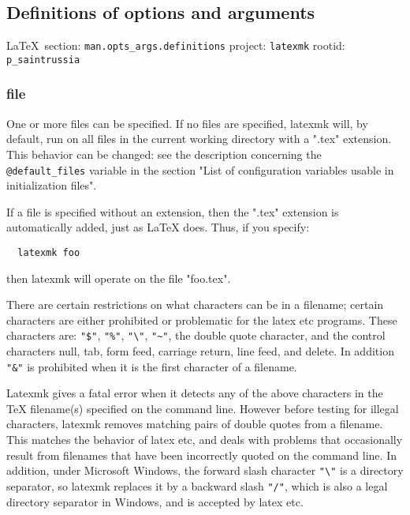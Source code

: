 

\subsection{Definitions of options and arguments}

\vspace{0.5cm}
 {\ifDEBUG\small\LaTeX~section: \verb|man.opts_args.definitions| project: \verb|latexmk| rootid: \verb|p_saintrussia| \fi}
\vspace{0.5cm}

\subsubsection{file}

One or more files can be specified.  If no files are  specified, latexmk  will,
by default, run on all files in the current working directory with a ".tex"
extension.   This  behavior  can  be changed: see the description concerning
the \verb|@default_files| variable in the section "List of configuration
variables  usable  in initialization files".

If a file is specified without an extension, then the ".tex" extension is
automatically added, just as LaTeX  does.   Thus,  if you specify:

\begin{verbatim}
  latexmk foo
\end{verbatim}

then latexmk will operate on the file "foo.tex".

There  are  certain  restrictions on what characters can be in a filename;
certain characters are either prohibited  or  problematic  for  the  latex
etc programs.  These characters are: \verb|"$"|, \verb|"%"|, \verb|"\"|,
\verb|"~"|, the double quote character, and the control characters  null,
tab,  form  feed, carriage return, line feed, and delete.  In addition
\verb|"&"| is prohibited  when  it  is  the  first character of a filename.

Latexmk  gives  a  fatal  error when it detects any of the above characters in
the TeX filename(s) specified on the command line.  However  before  testing
for illegal characters, latexmk removes matching pairs of double quotes from a
filename.   This  matches the  behavior  of  latex  etc,  and  deals  with
problems  that occasionally result from filenames that  have  been  incorrectly
quoted  on the command line.  In addition, under Microsoft Windows, the
forward slash character \verb|"\"| is a directory  separator, so  latexmk replaces it
by a backward slash \verb|"/"|, which is also a legal directory separator in Windows,
and is accepted  by  latex etc.

